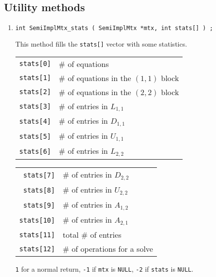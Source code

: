 \subsection{Utility methods}
\label{subsection:SemiImplMtx:proto:utility}
\par
\begin{enumerate}
\item
\begin{verbatim}
int SemiImplMtx_stats ( SemiImplMtx *mtx, int stats[] ) ;
\end{verbatim}
This method fills the {\tt stats[]} vector with some statistics.
\begin{center}
\begin{tabular}[t]{rl}
{\tt stats[0]} & \# of equations \\
{\tt stats[1]} & \# of equations in the $(1,1)$ block \\
{\tt stats[2]} & \# of equations in the $(2,2)$ block \\
{\tt stats[3]} & \# of entries in $L_{1,1}$ \\
{\tt stats[4]} & \# of entries in $D_{1,1}$ \\
{\tt stats[5]} & \# of entries in $U_{1,1}$ \\
{\tt stats[6]} & \# of entries in $L_{2,2}$ \\
\end{tabular}
\quad
\begin{tabular}[t]{rl}
{\tt stats[7]} & \# of entries in $D_{2,2}$ \\
{\tt stats[8]} & \# of entries in $U_{2,2}$ \\
{\tt stats[9]} & \# of entries in $A_{1,2}$ \\
{\tt stats[10]} & \# of entries in $A_{2,1}$ \\
{\tt stats[11]} & total \# of entries \\
{\tt stats[12]} & \# of operations for a solve 
\end{tabular}
\end{center}
\par {}
\par
{\tt 1} for a normal return,
{\tt -1} if {\tt mtx} is {\tt NULL},
{\tt -2} if {\tt stats} is {\tt NULL}.
\end{enumerate}
\par
